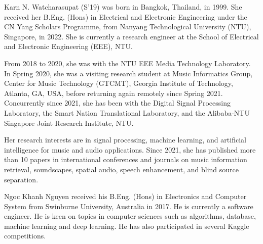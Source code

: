\documentclass[journal]{IEEEtran}
\begin{document}
\begin{IEEEbiography}{Karn N. Watcharasupat} (S'19) was born in Bangkok, Thailand, in 1999. She received her B.Eng. (Hons) in Electrical and Electronic Engineering under the CN Yang Scholars Programme, from Nanyang Technological University (NTU), Singapore, in 2022. She is currently a research engineer at the School of Electrical and Electronic Engineering (EEE), NTU.

From 2018 to 2020, she was with the NTU EEE Media Technology Laboratory. In Spring 2020, she was a visiting research student at Music Informatics Group, Center for Music Technology (GTCMT), Georgia Institute of Technology, Atlanta, GA, USA, before returning again remotely since Spring 2021. Concurrently since 2021, she has been with the Digital Signal Processing Laboratory, the Smart Nation Translational Laboratory, and the Alibaba-NTU Singapore Joint Research Institute, NTU.

Her research interests are in signal processing, machine learning, and artificial intelligence for music and audio applications. Since 2021, she has published more than 10 papers in international conferences and journals on music information retrieval, soundscapes, spatial audio, speech enhancement, and blind source separation.
\end{IEEEbiography}

\begin{IEEEbiography}{Ngoc Khanh Nguyen} received his B.Eng. (Hons) in Electronics and Computer System from Swinburne University, Australia in 2017. He is currently a software engineer. He is keen on topics in computer sciences such as algorithms, database, machine learning and deep learning. He has also participated in several Kaggle competitions.
\end{IEEEbiography}
\end{document}
